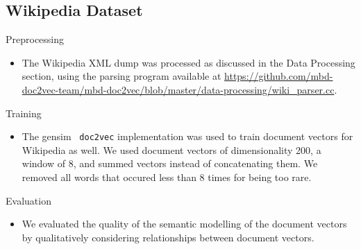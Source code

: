 \documentclass[11pt]{article}
\begin{document}
\subsection*{Wikipedia Dataset}
\begin{description}
  \item Preprocessing
    \begin{itemize}
      \item The Wikipedia XML dump was processed as discussed in the Data
            Processing section, using the parsing program available at
            \url{https://github.com/mbd-doc2vec-team/mbd-doc2vec/blob/master/data-processing/wiki_parser.cc}.
    \end{itemize}
  \item Training
    \begin{itemize}
      \item The gensim~\cite{gensim} \texttt{doc2vec} implementation was used
            to train document vectors for Wikipedia as well. We used document
            vectors of dimensionality 200, a window of 8, and summed vectors
            instead of concatenating them. We removed all words that occured
            less than 8 times for being too rare.
    \end{itemize}
  \item Evaluation
    \begin{itemize}
      \item We evaluated the quality of the semantic modelling of the
            document vectors by qualitatively considering relationships between
            document vectors.
    \end{itemize}
\end{description}
\end{document}
